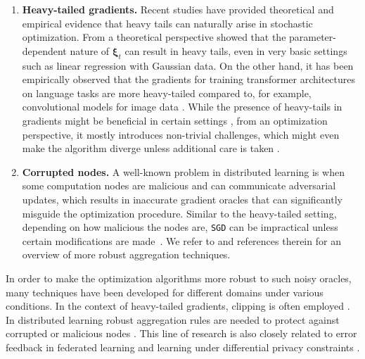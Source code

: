 \documentclass[10pt]{article} %
\renewcommand{\vec}[1]{\bm{#1}}
\newcommand{\SGD}{\texttt{SGD}}
\begin{document}
\begin{enumerate}[itemsep=0pt,topsep=0pt,leftmargin=.2in, label=(\roman*)]
\item \textbf{Heavy-tailed gradients.} Recent studies have provided theoretical and empirical evidence that 
    heavy tails can naturally arise in stochastic optimization. From a theoretical perspective \citet{pmlr-v139-gurbuzbalaban21a,hodgkinson2021multiplicative,pavasovic2023approximate} showed that the parameter-dependent nature of $\vec{\xi}_t$ can result in heavy tails, even in very basic settings such as linear regression with Gaussian data. On the other hand, it has been empirically observed that the gradients for training transformer architectures on language tasks are more heavy-tailed compared to, for example, convolutional models for image data \citep{zhang2020adaptive,kunstner2023noise}. While the presence of heavy-tails in gradients might be beneficial in certain settings \citep{simsekli2020hausdorff}, from an optimization perspective, it mostly introduces non-trivial challenges, which might even make the algorithm diverge unless additional care is taken \citep{zhang2020adaptive,Gorbunov2020}.  
\item \textbf{Corrupted nodes.} A well-known problem in distributed learning is 
when some computation nodes are malicious and can communicate adversarial updates, which results in inaccurate gradient oracles that can significantly misguide the optimization procedure. 
Similar to the heavy-tailed setting, depending on 
how malicious the nodes are,
\SGD{} can be impractical unless certain modifications are made~\citep{ICML-2018-MhamdiGR}.
We refer to \citet{Karimireddy2021} and references therein for an overview of more robust aggregation techniques.
\end{enumerate}


In order to make the optimization algorithms more robust to such noisy oracles, many techniques have been developed for different domains under various conditions. In the context of heavy-tailed gradients, clipping is often employed \citep{Zhang2020,Puchkin2023,Koloskova2023}. In distributed learning robust aggregation rules are needed to protect against corrupted or malicious nodes \citep{Data2018,Karimireddy2021,khirirat2023clip21}. This line of research is also closely related to error feedback in federated learning \citep{seide2014-bit,Karimireddy2019,richtarik2021ef} and learning under differential privacy constraints \citep{khirirat2023clip21}.
\end{document}
